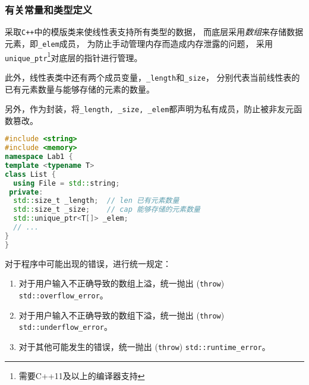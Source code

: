 \subsubsection{有关常量和类型定义}
采取\texttt{C++}中的模版类来使线性表支持所有类型的数据，
而底层采用\emph{数组}来存储数据元素，即\texttt{\_elem}成员，
为防止手动管理内存而造成内存泄露的问题，
采用\texttt{unique\_ptr}\footnote{需要C++11及以上的编译器支持}对底层的指针进行管理。
\par
此外，线性表类中还有两个成员变量，\texttt{\_length}和\texttt{\_size}，
分别代表当前线性表的已有元素数量与能够存储的元素的数量。
\par
另外，作为封装，将\texttt{\_length, \_size, \_elem}都声明为私有成员，防止被非友元函数篡改。
\begin{lstlisting}[language=c++]
#include <string>
#include <memory>
namespace Lab1 {
template <typename T>
class List {
  using File = std::string;
 private:
  std::size_t _length;  // len 已有元素数量
  std::size_t _size;    // cap 能够存储的元素数量
  std::unique_ptr<T[]> _elem;
  // ...
}
}
\end{lstlisting}
对于程序中可能出现的错误，进行统一规定：
\begin{enumerate}
    \item 对于用户输入不正确导致的数组上溢，统一抛出 (\texttt{throw}) \texttt{std::overflow\_error}。
    \item 对于用户输入不正确导致的数组下溢，统一抛出 (\texttt{throw}) \texttt{std::underflow\_error}。
    \item 对于其他可能发生的错误，统一抛出 (\texttt{throw}) \texttt{std::runtime\_error}。
\end{enumerate}
